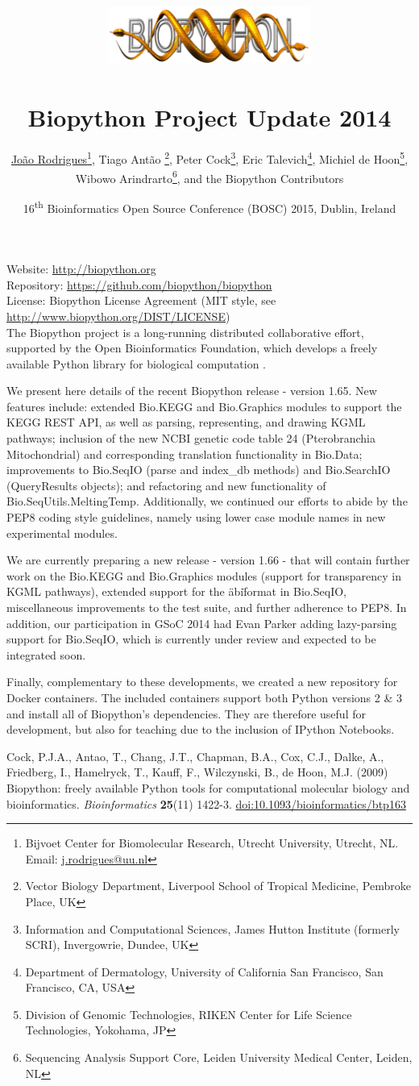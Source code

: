 \documentclass[10pt,oneside]{article}
\title{%
\vspace{-1.5in}
\includegraphics[width=0.5\textwidth]{biopython.jpg}\\
~\\Biopython Project Update 2014}
\author{
    \underline{Jo\~{a}o Rodrigues}\footnote{Bijvoet Center for Biomolecular Research, Utrecht University, Utrecht, NL. Email: \href{mailto:j.rodrigues@uu.nl}{j.rodrigues@uu.nl}},
    Tiago Ant\~{a}o \footnote{Vector Biology Department, Liverpool School of Tropical Medicine, Pembroke Place, UK},
    Peter Cock\footnote{Information and Computational Sciences, James Hutton Institute (formerly SCRI), Invergowrie, Dundee, UK},
    Eric Talevich\footnote{Department of Dermatology, University of California San Francisco, San Francisco, CA, USA},
    Michiel de Hoon\footnote{Division of Genomic Technologies, RIKEN Center for Life Science Technologies, Yokohama, JP},
		\\
    Wibowo Arindrarto\footnote{Sequencing Analysis Support Core, Leiden University Medical Center, Leiden, NL},
    and the Biopython Contributors}
\date{16\textsuperscript{th} Bioinformatics Open Source Conference (BOSC) 2015, Dublin, Ireland}
\begin{document}
\maketitle
\thispagestyle{empty}

\vspace{-0.2in}
\noindent
Website: \url{http://biopython.org} \\
Repository: \url{https://github.com/biopython/biopython} \\
License: Biopython License Agreement (MIT style, see \url{http://www.biopython.org/DIST/LICENSE}) \\

The Biopython project is a long-running distributed collaborative effort, 
supported by the Open Bioinformatics Foundation, which develops a freely 
available Python library for biological computation \cite{AppNote}.

We present here details of the recent Biopython release - version 1.65. New 
features include: extended Bio.KEGG and Bio.Graphics modules to support the 
KEGG REST API, as well as parsing, representing, and drawing KGML pathways; 
inclusion of the new NCBI genetic code table 24 (Pterobranchia Mitochondrial) 
and corresponding translation functionality in Bio.Data; improvements to 
Bio.SeqIO (parse and index\_db methods) and Bio.SearchIO (QueryResults objects); 
and refactoring and new functionality of Bio.SeqUtils.MeltingTemp. 
Additionally, we continued our efforts to abide by the PEP8 coding style guidelines, 
namely using lower case module names in new experimental modules.

We are currently preparing a new release - version 1.66 - that will contain 
further work on the Bio.KEGG and Bio.Graphics modules (support for transparency 
in KGML pathways), extended support for the \"abi\" format in Bio.SeqIO, 
miscellaneous improvements to the test suite, and further adherence to PEP8. In addition, 
our participation in GSoC 2014 had Evan Parker adding lazy-parsing support for 
Bio.SeqIO, which is currently under review and expected to be integrated soon.

Finally, complementary to these developments, we created a new repository for Docker
containers.  The included containers support both Python versions 2 
\& 3 and install all of Biopython's dependencies. They are therefore useful for 
development, but also for teaching due to the inclusion of IPython Notebooks.

\begin{thebibliography}{}

Cock, P.J.A., Antao, T., Chang, J.T., Chapman, B.A., Cox, C.J., Dalke, A., Friedberg, I., Hamelryck, T., Kauff, F., Wilczynski, B., de Hoon, M.J. (2009) Biopython: freely available Python tools for computational molecular biology and bioinformatics. {\it Bioinformatics} {\bf 25}(11) 1422-3. \href{http://dx.doi.org/10.1093/bioinformatics/btp163}{doi:10.1093/bioinformatics/btp163}

\end{thebibliography}
\end{document}
